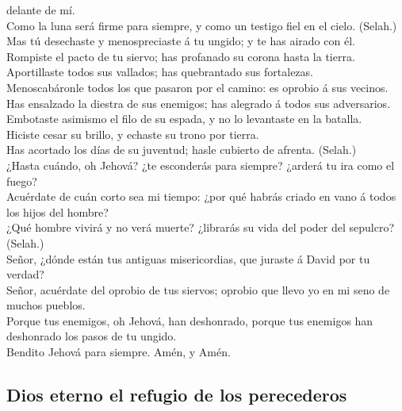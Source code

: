 delante de mí.\\
 Como la luna será firme para siempre, y como un testigo
fiel en el cielo. (Selah.)\\
 Mas tú desechaste y menospreciaste á tu ungido; y te has
airado con él.\\
 Rompiste el pacto de tu siervo; has profanado su corona
hasta la tierra.\\
 Aportillaste todos sus vallados; has quebrantado sus
fortalezas.\\
 Menoscabáronle todos los que pasaron por el camino: es
oprobio á sus vecinos.\\
 Has ensalzado la diestra de sus enemigos; has alegrado á
todos sus adversarios.\\
 Embotaste asimismo el filo de su espada, y no lo
levantaste en la batalla.\\
 Hiciste cesar su brillo, y echaste su trono por
tierra.\\
 Has acortado los días de su juventud; hasle cubierto de
afrenta. (Selah.)\\
 ¿Hasta cuándo, oh Jehová? ¿te esconderás para siempre?
¿arderá tu ira como el fuego?\\
 Acuérdate de cuán corto sea mi tiempo: ¿por qué habrás
criado en vano á todos los hijos del hombre?\\
 ¿Qué hombre vivirá y no verá muerte? ¿librarás su vida
del poder del sepulcro? (Selah.)\\
 Señor, ¿dónde están tus antiguas misericordias, que
juraste á David por tu verdad?\\
 Señor, acuérdate del oprobio de tus siervos; oprobio que
llevo yo en mi seno de muchos pueblos.\\
 Porque tus enemigos, oh Jehová, han deshonrado, porque
tus enemigos han deshonrado los pasos de tu ungido.\\
 Bendito Jehová para siempre. Amén, y Amén.

\hypertarget{dios-eterno-el-refugio-de-los-perecederos}{%
\subsection{Dios eterno el refugio de los
perecederos}\label{dios-eterno-el-refugio-de-los-perecederos}}


